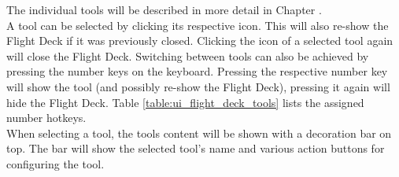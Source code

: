 
The individual tools will be described in more detail in Chapter . \\

A tool can be selected by clicking its respective icon. This will also re-show the Flight Deck if it was previously closed. 
Clicking the icon of a selected tool again will close the Flight Deck. Switching between tools can also be achieved by pressing 
the number keys on the keyboard. Pressing the respective number key will show the tool (and possibly re-show the Flight Deck), 
pressing it again will hide the Flight Deck. Table \ref{table:ui_flight_deck_tools} lists the assigned number hotkeys. \\

When selecting a tool, the tools content will be shown with a decoration bar on top. The bar will show the selected tool's name 
and various action buttons for configuring the tool.

